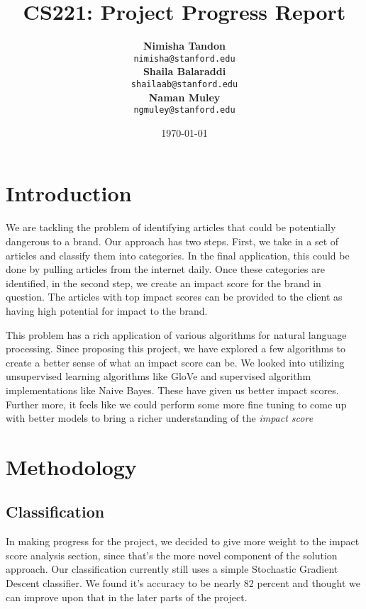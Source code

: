 \documentclass{article}
\title{CS221: Project Progress Report} %
\author{	\textbf{Nimisha Tandon}\\  \texttt{nimisha@stanford.edu} \\
		\textbf{Shaila Balaraddi}\\  \texttt{shailaab@stanford.edu} \\ 
		\textbf{Naman Muley}\\      \texttt{ngmuley@stanford.edu}}
\date{\today} %
\begin{document}
\maketitle %


\section{Introduction} %

We are tackling the problem of identifying articles that could be potentially dangerous to a brand. Our approach has two steps. First, we take in a set of articles and classify them into categories. In the final application, this could be done by pulling articles from the internet daily. Once these categories are identified, in the second step, we create an impact score for the brand in question. The articles with top impact scores can be provided to the client as having high potential for impact to the brand.

This problem has a rich application of various algorithms for natural language processing. Since proposing this project, we have explored a few algorithms to create a better sense of what an impact score can be. We looked into utilizing unsupervised learning algorithms like GloVe and supervised algorithm implementations like Naive Bayes. These have given us better impact scores. Further more, it feels like we could perform some more fine tuning to come up with better models to bring a richer understanding of the \textit{impact score}

\maketitle %
\section{Methodology} %

\subsection {Classification}
In making progress for the project, we decided to give more weight to the impact score analysis section, since that's the more novel component of the solution approach. Our classification currently still uses a simple Stochastic Gradient Descent classifier. We found it's accuracy to be nearly 82 percent and thought we can improve upon that in the later parts of the project.
\end{document}

